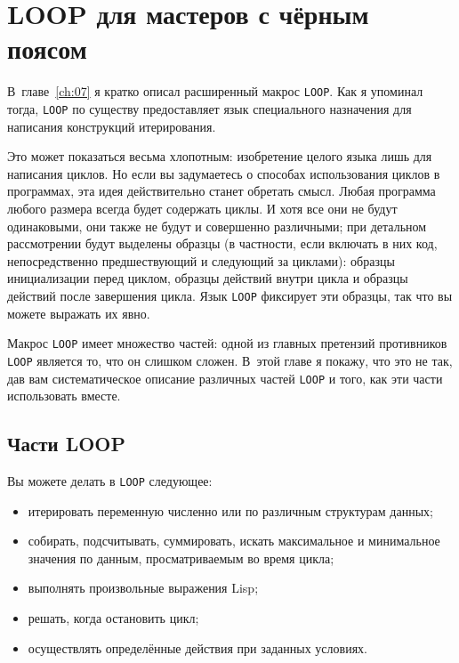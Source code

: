 \chapter{LOOP для мастеров с чёрным поясом}
\label{ch:22}

\thispagestyle{empty}

В~главе~\ref{ch:07} я кратко описал расширенный макрос \lstinline{LOOP}. Как я упоминал
тогда, \lstinline{LOOP} по существу предоставляет язык специального назначения для написания
конструкций итерирования.

Это может показаться весьма хлопотным: изобретение целого языка лишь для написания
циклов. Но если вы задумаетесь о способах использования циклов в программах, эта идея
действительно станет обретать смысл. Любая программа любого размера всег\-да будет содержать
циклы. И хотя все они не будут одинаковыми, они также не будут и совершенно различными;
при детальном рассмотрении будут выделены образцы (в частности, если включать в них код,
непосредственно предшествующий и следующий за циклами): образцы инициализации перед
циклом, образцы действий внутри цикла и образцы действий после завершения цикла. Язык
\lstinline{LOOP} фиксирует эти образцы, так что вы можете выражать их явно.

Макрос \lstinline{LOOP} имеет множество частей: одной из главных претензий противников
\lstinline{LOOP} является то, что он слишком сложен. В~этой главе я покажу, что это не так,
дав вам систематическое описание различных частей \lstinline{LOOP} и того, как эти части
использовать вместе.

\section{Части LOOP}

Вы можете делать в \lstinline{LOOP} следующее:

\begin{itemize}
\item итерировать переменную численно или по различным структурам данных;
\item собирать, подсчитывать, суммировать, искать максимальное и минимальное значения по
  данным, просматриваемым во время цикла;
\item выполнять произвольные выражения Lisp;
\item решать, когда остановить цикл;
\item осуществлять определённые действия при заданных условиях.
\end{itemize}

